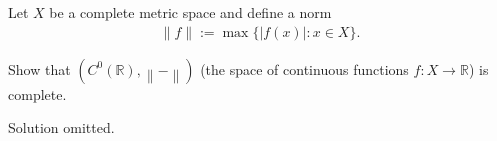 Let \(X\) be a complete metric space and define a norm
\begin{align*}
\|f\|:=\max \{|f(x)|: x \in X\}.
\end{align*}

Show that \((C^0({\mathbb{R}}), {\left\lVert {{-}} \right\rVert} )\)
(the space of continuous functions \(f: X\to {\mathbb{R}}\)) is
complete.


Solution omitted.


\printbibliography[title=Bibliography]



